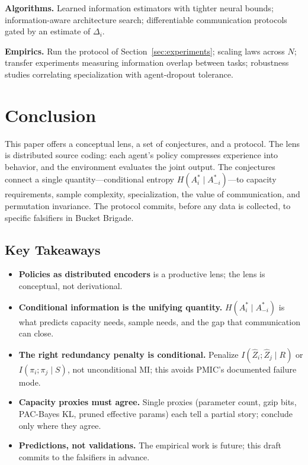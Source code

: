 \documentclass[10pt, letterpaper]{article}
\begin{document}
\textbf{Algorithms.} Learned information estimators with tighter neural bounds; information-aware architecture search; differentiable communication protocols gated by an estimate of $\Delta_i$.

\textbf{Empirics.} Run the protocol of Section~\ref{sec:experiments}; scaling laws across $N$; transfer experiments measuring information overlap between tasks; robustness studies correlating specialization with agent-dropout tolerance.

\section{Conclusion}
\label{sec:conclusion}

This paper offers a conceptual lens, a set of conjectures, and a protocol. The lens is distributed source coding: each agent's policy compresses experience into behavior, and the environment evaluates the joint output. The conjectures connect a single quantity---conditional entropy $H(A_i^*\mid A_{-i}^*)$---to capacity requirements, sample complexity, specialization, the value of communication, and permutation invariance. The protocol commits, before any data is collected, to specific falsifiers in Bucket Brigade.

\subsection*{Key Takeaways}
\begin{itemize}
    \item \textbf{Policies as distributed encoders} is a productive lens; the lens is conceptual, not derivational.
    \item \textbf{Conditional information is the unifying quantity.} $H(A_i^*\mid A_{-i}^*)$ is what predicts capacity needs, sample needs, and the gap that communication can close.
    \item \textbf{The right redundancy penalty is conditional.} Penalize $I(\hat{Z}_i; \hat{Z}_j \mid R)$ or $I(\pi_i; \pi_j \mid S)$, not unconditional MI; this avoids PMIC's documented failure mode.
    \item \textbf{Capacity proxies must agree.} Single proxies (parameter count, gzip bits, PAC-Bayes KL, pruned effective params) each tell a partial story; conclude only where they agree.
    \item \textbf{Predictions, not validations.} The empirical work is future; this draft commits to the falsifiers in advance.
\end{itemize}
\end{document}
